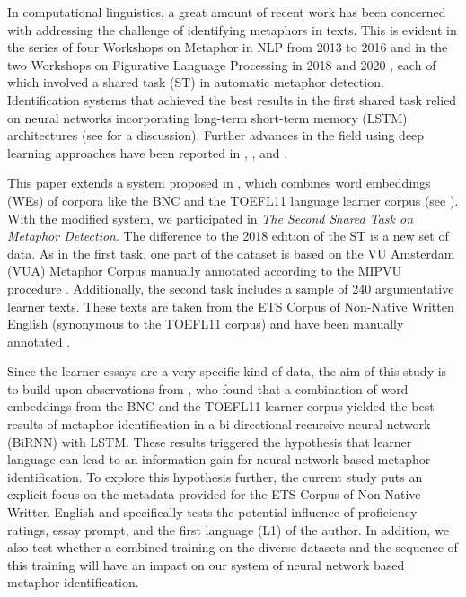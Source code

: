 \documentclass[11pt,a4paper]{article}
\begin{document}
In computational linguistics, a great amount of recent work has been concerned with addressing the challenge of identifying metaphors in texts. This is evident in the series of four Workshops on Metaphor in NLP from 2013 to 2016 and in the two Workshops on Figurative Language Processing in 2018 \citep{ws-2018} and 2020 \citep{leong2020}, each of which involved a shared task (ST) in automatic metaphor detection. Identification systems that achieved the best results in the first shared task relied on neural networks incorporating long-term short-term memory (LSTM) architectures (see \citealp{mu-EtAl:2019} for a discussion). Further advances in the field using deep learning approaches have been reported in \citet{dankers-etal-2019-modelling}, \citet{gao-etal-2018-neural-metaphor}, and \citet{rei-etal-2017}.

This paper extends a system proposed in \citet{stemle-onysko:2018:naacl-flpst}, which combines word embeddings (WEs) of corpora like the BNC \citep{BNC:2007} and the TOEFL11 language learner corpus (see \citealp{Blanchard-EtAl:TOEFL11}). With the modified system, we participated in \emph{The Second Shared Task on Metaphor Detection}. The difference to the 2018 edition of the ST is a new set of data. As in the first task, one part of the dataset is based on the VU Amsterdam (VUA) Metaphor Corpus manually annotated according to the MIPVU procedure \citep{Steen2010}. Additionally, the second task includes a sample of 240 argumentative learner texts. These texts are taken from the ETS Corpus of Non-Native Written English (synonymous to the TOEFL11 corpus) and have been manually annotated \citep{beigmanklebanov-EtAl:2018}. 

Since the learner essays are a very specific kind of data, the aim of this study is to build upon observations from \citet{stemle-onysko:2018:naacl-flpst}, who found that a combination of word embeddings from the BNC and the TOEFL11 learner corpus yielded the best results of metaphor identification in a bi-directional recursive neural network (BiRNN) with LSTM. These results triggered the hypothesis that learner language can lead to an information gain for neural network based metaphor identification. To explore this hypothesis further, the current study puts an explicit focus on the metadata provided for the ETS Corpus of Non-Native Written English and specifically tests the potential influence of proficiency ratings, essay prompt, and the first language (L1) of the author. In addition, we also test whether a combined training on the diverse datasets and the sequence of this training will have an impact on our system of neural network based metaphor identification. 
\end{document}
